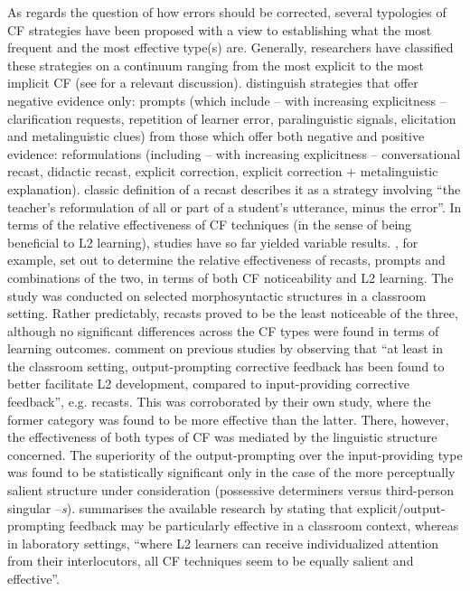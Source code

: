 \documentclass[output=paper,colorlinks,citecolor=brown,modfonts,nonflat]{../langscibook}
\begin{document}
As regards the question of how errors should be corrected, several typologies of CF strategies have been proposed with a view to establishing what the most frequent and the most effective type(s) are. Generally, researchers have classified these strategies on a continuum ranging from the most explicit to the most implicit CF (see \citet{Sheen2006} for a relevant discussion). \citet{LysterEtAl2013} distinguish strategies that offer negative evidence only: prompts (which include – with increasing explicitness – clarification requests, repetition of learner error, paralinguistic signals, elicitation and metalinguistic clues) from those which offer both negative and positive evidence: reformulations (including – with increasing explicitness – conversational recast, didactic recast, explicit correction, explicit correction + metalinguistic explanation).  classic definition of a recast describes it as a strategy involving “the teacher’s reformulation of all or part of a student’s utterance, minus the error”. In terms of the relative effectiveness of CF techniques (in the sense of being beneficial to L2 learning), studies have so far yielded variable results. \citet{KartchavaAmmar2014}, for example, set out to determine the relative effectiveness of recasts, prompts and combinations of the two, in terms of both CF noticeability and L2 learning. The study was conducted on selected morphosyntactic structures in a classroom setting. Rather predictably, recasts proved to be the least noticeable of the three, although no significant differences across the CF types were found in terms of learning outcomes. \citet[514]{SatoLoewen2018} comment on previous studies by observing that “at least in the classroom setting, output-prompting corrective feedback has been found to better facilitate L2 development, compared to input-providing corrective feedback”, e.g. recasts. This was corroborated by their own study, where the former category was found to be more effective than the latter. There, however, the effectiveness of both types of CF was mediated by the linguistic structure concerned. The superiority of the output-prompting over the input-providing type was found to be statistically significant only in the case of the more perceptually salient structure under consideration (possessive determiners versus third-person singular –\textit{s}). \citet{SaitoInPress} summarises the available research by stating that explicit/output-prompting feedback may be particularly effective in a classroom context, whereas in laboratory settings, “where L2 learners can receive individualized attention from their interlocutors, all CF techniques seem to be equally salient and effective”.
\end{document}
